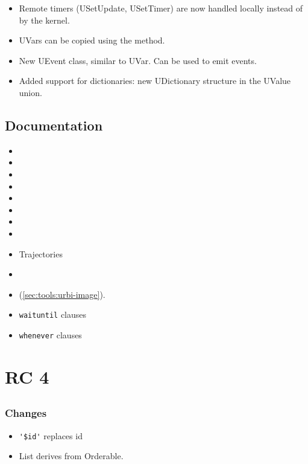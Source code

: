 \begin{itemize}
\item Remote timers (USetUpdate, USetTimer) are now handled locally
  instead of by the kernel.
\item UVars can be copied using the  method.
\item New UEvent class, similar to UVar. Can be used to emit events.
\item Added support for dictionaries: new UDictionary structure in the
  UValue union.
\end{itemize}

\subsection{Documentation}

\begin{itemize}
\item {}
\item {}
\item {}
\item {}
\item {}
\item {}
\item {}
\item {}
\item Trajectories
\item {}
\item {} (\autoref{sec:tools:urbi-image}).
\item \lstinline{waituntil} clauses
\item \lstinline{whenever} clauses
\end{itemize}

\section{ RC 4}

\subsection{\us}
\subsubsection{Changes}

\begin{itemize}
\item \lstinline|'$id'| replaces id %
\item List derives from Orderable.
\end{itemize}

